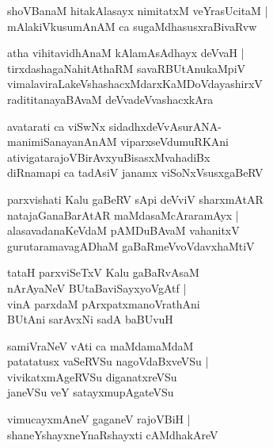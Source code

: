 \begin{shloka}
shoVBanaM hitakAlasayx nimitatxM veYrasUcitaM |\\
mAlakiVkusumAnAM ca sugaMdhasusxraBivaRvw
\end{shloka}

\begin{shloka}
atha vihitavidhAnaM kAlamAsAdhayx deVvaH |\\
tirxdashagaNahitAthaRM savaRBUtAnukaMpiV \\
vimalaviraLakeVshashacxMdarxKaMDoVdayashirxV\\
radititanayaBAvaM deVvadeVvashacxkAra 
\end{shloka}

\begin{shloka}
avatarati ca viSwNx sidadhxdeVvAsurANA-\\
manimiSanayanAnAM viparxseVdumuRKAni\\
ativigatarajoVBirAvxyuBisasxMvahadiBx\\
diRnamapi ca tadAsiV janamx viSoNxVsusxgaBeRV
\end{shloka}

\begin{shloka}
parxvishati Kalu gaBeRV sApi deVviV sharxmAtAR\\
natajaGanaBarAtAR maMdasaMcAraramAyx |\\
alasavadanaKeVdaM pAMDuBAvaM vahanitxV\\
gurutaramavagADhaM gaBaRmeVvoVdavxhaMtiV
\end{shloka}

\begin{shloka}
tataH parxviSeTxV Kalu gaBaRvAsaM\\
nArAyaNeV BUtaBaviSayxyoVgAtf |\\
vinA parxdaM pArxpatxmanoVrathAni\\
BUtAni sarAvxNi sadA baBUvuH
\end{shloka}

\begin{shloka}
samiVraNeV vAti ca maMdamaMdaM\\
patatatusx vaSeRVSu nagoVdaBxveVSu |\\
vivikatxmAgeRVSu diganatxreVSu\\
janeVSu veY satayxmupAgateVSu
\end{shloka}

\begin{shloka}
vimucayxmAneV gaganeV rajoVBiH |\\
shaneYshayxneYnaRshayxti cAMdhakAreV
\end{shloka}

